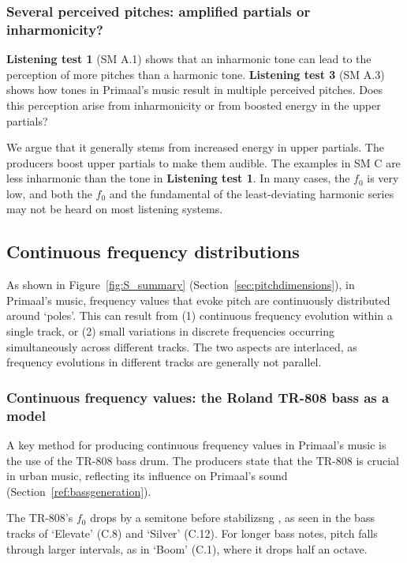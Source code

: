 \documentclass{article}
\begin{document}
\subsubsection{Several perceived pitches: amplified partials or inharmonicity?}\label{sec:severalperceived}

\textbf{Listening test 1} (SM A.1) shows that an inharmonic tone can lead to the perception of more pitches than a harmonic tone. \textbf{Listening test 3} (SM A.3) shows how tones in Primaal's music result in multiple perceived pitches. Does this perception arise from inharmonicity or from boosted energy in the upper partials?

We argue that it generally stems from increased energy in upper partials. The producers boost upper partials to make them audible. The examples in SM C are less inharmonic than the tone in \textbf{Listening test 1}. In many cases, the $f_0$ is very low, and both the $f_0$ and the fundamental of the least-deviating harmonic series \citep[p.~9]{rasch1982perception} may not be heard on most listening systems.


\subsection{Continuous frequency distributions}\label{sec:continousfreqs}

As shown in Figure~\ref{fig:S_summary} (Section~\ref{sec:pitchdimensions}), in Primaal's music, frequency values that evoke pitch are continuously distributed around `poles'. This can result from (1) continuous frequency evolution within a single track, or (2) small variations in discrete frequencies occurring simultaneously across different tracks. The two aspects are interlaced, as frequency evolutions in different tracks are generally not parallel.

\subsubsection{Continuous frequency values: the Roland TR-808 bass as a model} 

A key method for producing continuous frequency values in Primaal's music is the use of the TR-808 bass drum. The producers state that the TR-808 is crucial in urban music, reflecting its influence on Primaal's sound (Section~\ref{ref:bassgeneration}).

The TR-808's $f_0$ drops by a semitone before stabilizsng \citep{deruty2024storch}, as seen in the bass tracks of `Elevate' (C.8) and `Silver' (C.12). For longer bass notes, pitch falls through larger intervals, as in `Boom' (C.1), where it drops half an octave.
\end{document}
